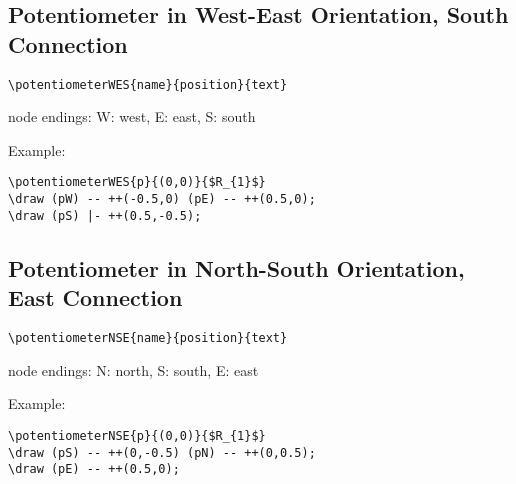 \documentclass[parskip=full]{scrartcl}
\begin{document}
\subsection{Potentiometer in West-East Orientation, South Connection}

\begin{verbatim}
\potentiometerWES{name}{position}{text}
\end{verbatim}
node endings: W: west, E: east, S: south

Example:\\
\begin{minipage}{0.8\textwidth}
\begin{verbatim}
\potentiometerWES{p}{(0,0)}{$R_{1}$}
\draw (pW) -- ++(-0.5,0) (pE) -- ++(0.5,0);
\draw (pS) |- ++(0.5,-0.5);
\end{verbatim}
\end{minipage}
\begin{minipage}{0.19\textwidth}
\end{minipage}

\subsection{Potentiometer in North-South Orientation, East Connection}

\begin{verbatim}
\potentiometerNSE{name}{position}{text}
\end{verbatim}
node endings: N: north, S: south, E: east

Example:\\
\begin{minipage}{0.8\textwidth}
\begin{verbatim}
\potentiometerNSE{p}{(0,0)}{$R_{1}$}
\draw (pS) -- ++(0,-0.5) (pN) -- ++(0,0.5);
\draw (pE) -- ++(0.5,0);
\end{verbatim}
\end{minipage}
\begin{minipage}{0.19\textwidth}
\end{minipage}
\end{document}
